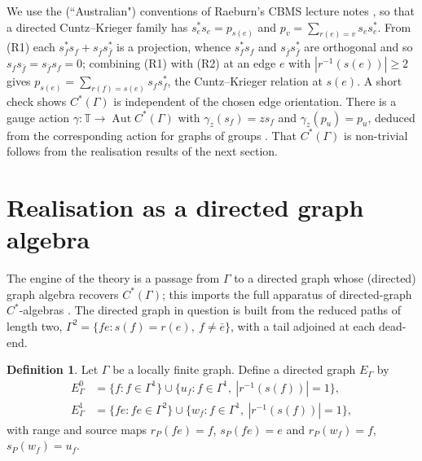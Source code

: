 \documentclass[12pt,reqno]{amsart}
\theoremstyle{plain}
\theoremstyle{definition}
\newtheorem{definition}[theorem]{Definition}
\newcommand{\T}{\mathbb{T}}
\begin{document}
We use the (``Australian") conventions of Raeburn's CBMS lecture notes \cite{Raeburn}, so that a directed
Cuntz--Krieger family has $s_e^{*}s_e=p_{s(e)}$ and $p_v=\sum_{r(e)=v}s_es_e^{*}$. From (R1) each
$s_f^{*}s_f+s_{\bar f}s_{\bar f}^{*}$ is a projection, whence $s_f^{*}s_f$ and
$s_{\bar f}s_{\bar f}^{*}$ are orthogonal and so $s_fs_{\bar f}=s_{\bar f}s_f=0$; combining (R1)
with (R2) at an edge $e$ with $|r^{-1}(s(e))|\ge 2$ gives
$p_{s(e)}=\sum_{r(f)=s(e)}s_fs_f^{*}$, the Cuntz--Krieger relation at $s(e)$. A short check
shows $C^*(\Gamma)$ is independent of the chosen edge
orientation. There is a gauge action $\gamma\colon\T\to\operatorname{Aut}C^*(\Gamma)$ with
$\gamma_z(s_f)=zs_f$ and $\gamma_z(p_u)=p_u$, deduced from the corresponding action for graphs of
groups \cite{BMPST}. That $C^*(\Gamma)$ is non-trivial follows from the realisation results of the
next section.

\section{Realisation as a directed graph algebra}\label{sec:realisation}

The engine of the theory is a passage from $\Gamma$ to a directed graph whose (directed) graph
algebra recovers $C^*(\Gamma)$; this imports the full apparatus of directed-graph $C^*$-algebras
\cite{KPR,RS}. The directed graph in question is built from the reduced paths of length two,
$\Gamma^2=\{fe: s(f)=r(e),\ f\neq\bar e\}$, with a tail adjoined at each dead-end.

\begin{definition}\label{def:EGamma}
Let $\Gamma$ be a locally finite graph. Define a directed graph $E_\Gamma$ by
\begin{align*}
E_\Gamma^0 &= \{f : f\in\Gamma^1\}\cup\{u_f : f\in\Gamma^1,\ |r^{-1}(s(f))|=1\},\\
E_\Gamma^1 &= \{fe : fe\in\Gamma^2\}\cup\{w_f : f\in\Gamma^1,\ |r^{-1}(s(f))|=1\},
\end{align*}
with range and source maps $r_P(fe)=f$, $s_P(fe)=e$ and $r_P(w_f)=f$, $s_P(w_f)=u_f$.
\end{definition}
\end{document}
